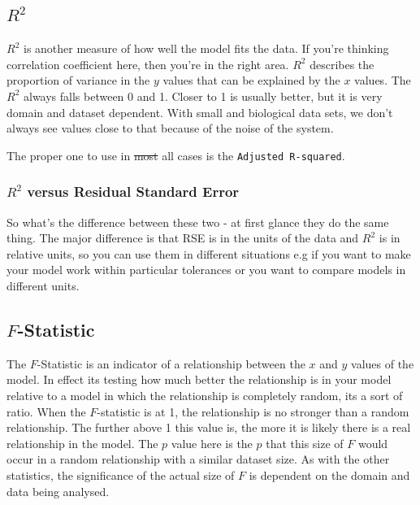 \documentclass[
]{book}
\begin{document}
\hypertarget{r2}{%
\subsection{\texorpdfstring{\(R^2\)}{R\^{}2}}\label{r2}}

\(R^2\) is another measure of how well the model fits the data. If you're thinking correlation coefficient here, then you're in the right area. \(R^2\) describes the proportion of variance in the \(y\) values that can be explained by the \(x\) values. The \(R^2\) always falls between 0 and 1. Closer to 1 is usually better, but it is very domain and dataset dependent. With small and biological data sets, we don't always see values close to that because of the noise of the system.

The proper one to use in \sout{most} all cases is the \texttt{Adjusted\ R-squared}.

\hypertarget{r2-versus-residual-standard-error}{%
\subsubsection{\texorpdfstring{\(R^2\) versus Residual Standard Error}{R\^{}2 versus Residual Standard Error}}\label{r2-versus-residual-standard-error}}

So what's the difference between these two - at first glance they do the same thing. The major difference is that RSE is in the units of the data and \(R^2\) is in relative units, so you can use them in different situations e.g if you want to make your model work within particular tolerances or you want to compare models in different units.

\hypertarget{f-statistic}{%
\subsection{\texorpdfstring{\(F\)-Statistic}{F-Statistic}}\label{f-statistic}}

The \(F\)-Statistic is an indicator of a relationship between the \(x\) and \(y\) values of the model. In effect its testing how much better the relationship is in your model relative to a model in which the relationship is completely random, its a sort of ratio. When the \(F\)-statistic is at 1, the relationship is no stronger than a random relationship. The further above 1 this value is, the more it is likely there is a real relationship in the model. The \(p\) value here is the \(p\) that this size of \(F\) would occur in a random relationship with a similar dataset size. As with the other statistics, the significance of the actual size of \(F\) is dependent on the domain and data being analysed.
\end{document}
